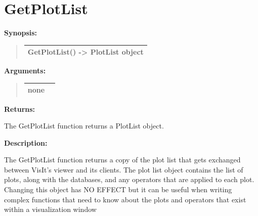 \documentclass[letterpaper,10pt,english]{sphinxmanual}
\begin{document}
\section{GetPlotList}
\label{functions:getplotlist}
\begin{DUlineblock}{0em}
\item[] \textbf{Synopsis:}
\end{DUlineblock}
\begin{quote}

\begin{tabulary}{\linewidth}{|L|}
\hline

GetPlotList() -\textgreater{} PlotList object
\\
\hline\end{tabulary}

\end{quote}

\begin{DUlineblock}{0em}
\item[] 
\item[] \textbf{Arguments:}
\end{DUlineblock}
\begin{quote}

\begin{tabulary}{\linewidth}{|L|L|}
\hline

none
 & \\
\hline\end{tabulary}

\end{quote}

\begin{DUlineblock}{0em}
\item[] 
\item[] \textbf{Returns:}
\item[] The GetPlotList function returns a PlotList object.
\item[] 
\item[] \textbf{Description:}
\item[] The GetPlotList function returns a copy of the plot list that gets exchanged
between VisIt's viewer and its clients. The plot list object contains the list
of plots, along with the databases, and any operators that are applied to each
plot. Changing this object has NO EFFECT but it can be useful when writing
complex functions that need to know about the plots and operators that exist
within a visualization window
\end{DUlineblock}

\begin{DUlineblock}{0em}
\item[] 
\end{DUlineblock}
\end{document}
